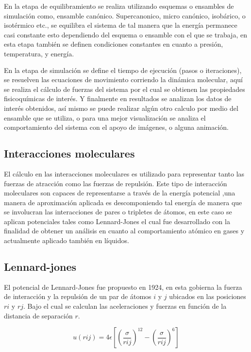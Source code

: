 \documentclass[3pt,twocolumn]{elsarticle}
\begin{document}
En la etapa de equilibramiento se realiza utilizando esquemas o ensambles de simulación como, ensamble canónico. Supercanonico, micro canónico, isobárico, o isotérmico etc., se equilibra el sistema de tal manera que la energía permanece casi constante esto dependiendo del esquema o ensamble con el que se trabaja, en esta etapa también se definen condiciones constantes en cuanto a presión, temperatura, y energía. 

En la etapa de simulación se define el tiempo de ejecución (pasos o iteraciones), se resuelven las ecuaciones de movimiento corriendo la dinámica molecular, aquí se realiza el cálculo de fuerzas del sistema por el cual se obtienen las propiedades fisicoquímicas de interés. Y finalmente en resultados se analizan los datos de interés obtenidos, así mismo se puede realizar algún otro calculo por medio del ensamble que se utiliza, o para una mejor visualización se analiza el comportamiento del sistema con el apoyo de imágenes, o alguna animación.


\subsection{Interacciones moleculares}
El cálculo en las interacciones moleculares es utilizado para representar tanto las fuerzas de atracción como las fuerzas de repulsión. Este tipo de interacción moleculares son capaces de representarse a través de la energía potencial \cite{revist,docM},una manera de aproximación aplicada es descomponiendo tal energía de manera que se involucran las interacciones de pares o tripletes de átomos, en este caso se aplican potenciales tales como Lennard-Jones el cual fue desarrollado con la finalidad de obtener un análisis en cuanto al comportamiento atómico en gases y actualmente aplicado también en líquidos.


\subsection{Lennard-jones}
El potencial de Lennard-Jones \cite{LJN} fue propuesto en 1924, en esta gobierna la fuerza de interacción y la repulsión de un par de átomos $i$ y $j$ ubicados en las posiciones $ri$ y $rj$. Bajo el cual se calculan las aceleraciones y fuerzas en función de la distancia de separación $r$.

\begin{equation}
u(rij)=4 \epsilon[ (\frac{\sigma}{rij} )^{12} - (\frac{\sigma}{rij} )^6]
\end{equation}
\end{document}
